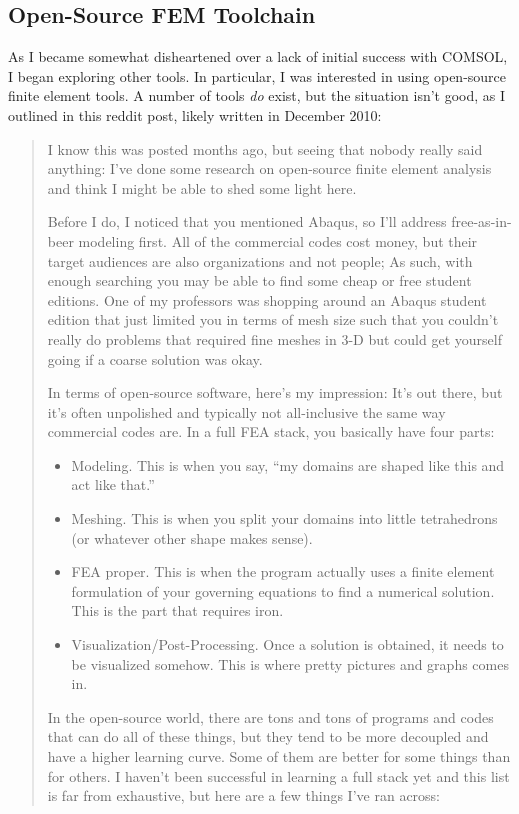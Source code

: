 \subsection{Open-Source FEM Toolchain}

As I became somewhat disheartened over a lack of initial success with
COMSOL, I began exploring other tools. In particular, I was interested
in using open-source finite element tools. A number of tools \emph{do}
exist, but the situation isn't good, as I outlined in this reddit post,
likely written in December 2010:

\begin{quote}
I know this was posted months ago, but seeing that nobody really said
anything: I've done some research on open-source finite element analysis
and think I might be able to shed some light here.

Before I do, I noticed that you mentioned Abaqus, so I'll address
free-as-in-beer modeling first. All of the commercial codes cost money,
but their target audiences are also organizations and not people; As
such, with enough searching you may be able to find some cheap or free
student editions. One of my professors was shopping around an Abaqus
student edition that just limited you in terms of mesh size such that
you couldn't really do problems that required fine meshes in 3-D but
could get yourself going if a coarse solution was okay.

In terms of open-source software, here's my impression: It's out there,
but it's often unpolished and typically not all-inclusive the same way
commercial codes are. In a full FEA stack, you basically have four
parts:

\begin{itemize}
\item
  Modeling. This is when you say, ``my domains are shaped like this and
  act like that.''
\item
  Meshing. This is when you split your domains into little tetrahedrons
  (or whatever other shape makes sense).
\item
  FEA proper. This is when the program actually uses a finite element
  formulation of your governing equations to find a numerical solution.
  This is the part that requires iron.
\item
  Visualization/Post-Processing. Once a solution is obtained, it needs
  to be visualized somehow. This is where pretty pictures and graphs
  comes in.
\end{itemize}
In the open-source world, there are tons and tons of programs and codes
that can do all of these things, but they tend to be more decoupled and
have a higher learning curve. Some of them are better for some things
than for others. I haven't been successful in learning a full stack yet
and this list is far from exhaustive, but here are a few things I've ran
across:


\end{quote}
